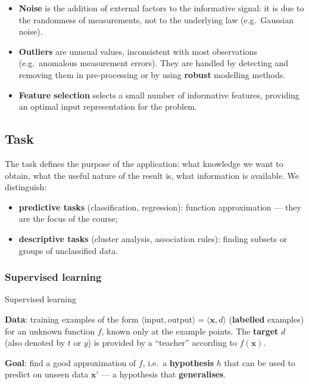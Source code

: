 \begin{itemize}
\tightlist
\item
  \textbf{Noise} is the addition of external factors to the
  informative signal: it is due to the randomness of measurements, not
  to the underlying law (e.g.\ Gaussian noise).
\item
  \textbf{Outliers} are unusual values, inconsistent with most
  observations (e.g.\ anomalous measurement errors). They are handled
  by detecting and removing them in pre-processing or by using
  \textbf{robust} modelling methods.
\item
  \textbf{Feature selection} selects a small number of informative
  features, providing an optimal input representation for the problem.
\end{itemize}

\subsection{Task}\label{task}

The task defines the purpose of the application: what knowledge we
want to obtain, what the useful nature of the result is, what
information is available. We distinguish:

\begin{itemize}
\tightlist
\item
  \textbf{predictive tasks} (classification, regression): function
  approximation --- they are the focus of the course;
\item
  \textbf{descriptive tasks} (cluster analysis, association rules):
  finding subsets or groups of unclassified data.
\end{itemize}

\subsubsection{Supervised
learning}\label{apprendimento-supervisionato}

\begin{boxdefinition}{Supervised learning}

\textbf{Data}: training examples of the form
\(\langle \text{input}, \text{output}\rangle = \langle \mathbf{x}, d\rangle\)
(\textbf{labelled} examples) for an unknown function \(f\), known only
at the example points. The \textbf{target} \(d\) (also denoted by \(t\)
or \(y\)) is provided by a ``teacher'' according to \(f(\mathbf{x})\).

\textbf{Goal}: find a good approximation of \(f\), i.e.\ a
\textbf{hypothesis} \(h\) that can be used to predict on unseen data
\(\mathbf{x}'\) --- a hypothesis that \textbf{generalises}.

\end{boxdefinition}

